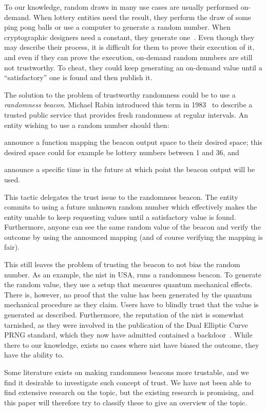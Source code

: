 To our knowledge, random draws in many use cases are usually performed on-demand.
When lottery entities need the result, they perform the draw of some ping pong balls or use a computer to generate a random number. When cryptographic designers need a constant, they generate one~\cite{baigneres2015trap}.
Even though they may describe their process, it is difficult for them to prove their execution of it, and even if they can prove the execution, on-demand random numbers are still not trustworthy. To cheat, they could keep generating an on-demand value until a \enquote{satisfactory} one is found and then publish it.

The solution to the problem of trustworthy randomness could be to use a \emph{randomness beacon}.
Michael Rabin introduced this term in 1983~\cite{rabin1983transaction} to describe a trusted public service that provides fresh randomness at regular intervals.
An entity wishing to use a random number should then:
\begin{eromanate*}
    \item announce a function mapping the beacon output space to their desired space; this desired space could for example be lottery numbers between 1 and 36, and
    \item announce a specific time in the future at which point the beacon output will be used.
\end{eromanate*}
This tactic delegates the trust issue to the randomness beacon.
The entity commits to using a future unknown random number which effectively makes the entity unable to keep requesting values until a satisfactory value is found.
Furthermore, anyone can see the same random value of the beacon and verify the outcome by using the announced mapping (and of course verifying the mapping is fair).

This still leaves the problem of trusting the beacon to not bias the random number.
As an example, the \gls{nist} in USA, runs a randomness beacon.
To generate the random value, they use a setup that measures quantum mechanical effects.
There is, however, no proof that the value has been generated by the quantum mechanical procedure as they claim.
Users have to blindly trust that the value is generated as described.
Furthermore, the reputation of the \gls{nist} is somewhat tarnished, as they were involved in the publication of the Dual Elliptic Curve PRNG standard, which they now have admitted contained a backdoor~\cite{nist2014backdoor}.
While there to our knowledge, exists no cases where \gls{nist} have biased the outcome, they have the ability to.

Some literature exists on making randomness beacons more trustable, and we find it desirable to investigate such concept of trust.
We have not been able to find extensive research on the topic, but the existing research is promising, and this paper will therefore try to classify these to give an overview of the topic.

